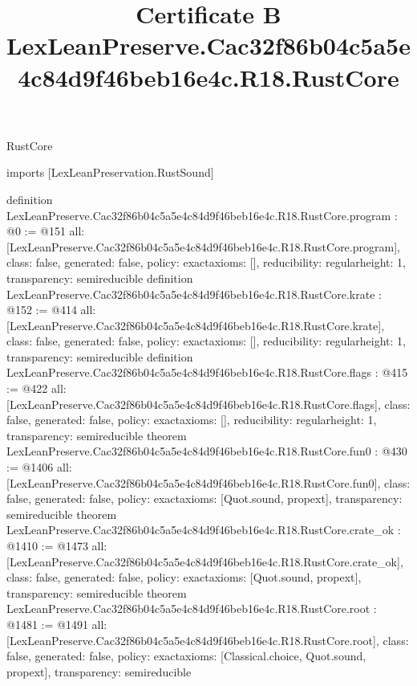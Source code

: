 \begin{lexlean}{RustCore}
\title{Certificate B LexLeanPreserve.Cac32f86b04c5a5e4c84d9f46beb16e4c.R18.RustCore}
\begin{coremodule}
imports [LexLeanPreservation.RustSound]

definition LexLeanPreserve.Cac32f86b04c5a5e4c84d9f46beb16e4c.R18.RustCore.program : @0 := @151 {
  all: [LexLeanPreserve.Cac32f86b04c5a5e4c84d9f46beb16e4c.R18.RustCore.program],
  class: false,
  generated: false,
  policy: exact{axioms: []},
  reducibility: regular{height: 1},
  transparency: semireducible
}
definition LexLeanPreserve.Cac32f86b04c5a5e4c84d9f46beb16e4c.R18.RustCore.krate : @152 := @414 {
  all: [LexLeanPreserve.Cac32f86b04c5a5e4c84d9f46beb16e4c.R18.RustCore.krate],
  class: false,
  generated: false,
  policy: exact{axioms: []},
  reducibility: regular{height: 1},
  transparency: semireducible
}
definition LexLeanPreserve.Cac32f86b04c5a5e4c84d9f46beb16e4c.R18.RustCore.flags : @415 := @422 {
  all: [LexLeanPreserve.Cac32f86b04c5a5e4c84d9f46beb16e4c.R18.RustCore.flags],
  class: false,
  generated: false,
  policy: exact{axioms: []},
  reducibility: regular{height: 1},
  transparency: semireducible
}
theorem LexLeanPreserve.Cac32f86b04c5a5e4c84d9f46beb16e4c.R18.RustCore.fun0 : @430 := @1406 {
  all: [LexLeanPreserve.Cac32f86b04c5a5e4c84d9f46beb16e4c.R18.RustCore.fun0],
  class: false,
  generated: false,
  policy: exact{axioms: [Quot.sound, propext]},
  transparency: semireducible
}
theorem LexLeanPreserve.Cac32f86b04c5a5e4c84d9f46beb16e4c.R18.RustCore.crate_ok : @1410 := @1473 {
  all: [LexLeanPreserve.Cac32f86b04c5a5e4c84d9f46beb16e4c.R18.RustCore.crate_ok],
  class: false,
  generated: false,
  policy: exact{axioms: [Quot.sound, propext]},
  transparency: semireducible
}
theorem LexLeanPreserve.Cac32f86b04c5a5e4c84d9f46beb16e4c.R18.RustCore.root : @1481 := @1491 {
  all: [LexLeanPreserve.Cac32f86b04c5a5e4c84d9f46beb16e4c.R18.RustCore.root],
  class: false,
  generated: false,
  policy: exact{axioms: [Classical.choice, Quot.sound, propext]},
  transparency: semireducible
}


\end{coremodule}
\end{lexlean}
